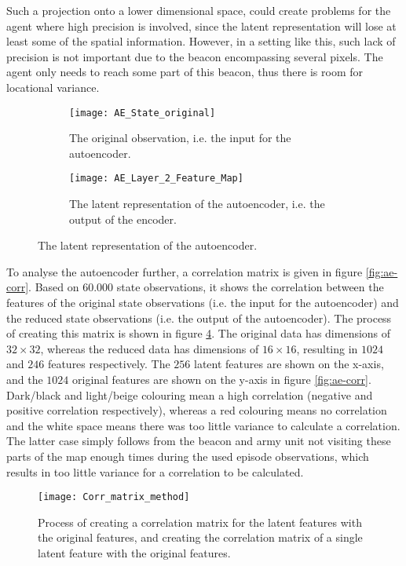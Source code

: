 Such a projection onto a lower dimensional space, could create problems for the agent where high precision is involved, since the latent representation will lose at least some of the spatial information. However, in a setting like this, such lack of precision is not important due to the beacon encompassing several pixels. The agent only needs to reach some part of this beacon, thus there is room for locational variance. 

\begin{figure}[h!]
	\centering
	\begin{subfigure}[b]{0.30\textwidth}
		\texttt{[image: AE\_State\_original]}
		\caption{The original observation, i.e. the input for the autoencoder.}
		\label{fig:ae-featuremap-original} 
	\end{subfigure}\hfill
	\begin{subfigure}[b]{0.30\textwidth}
		\texttt{[image: AE\_Layer\_2\_Feature\_Map]}
		\caption{The latent representation of the autoencoder, i.e. the output of the encoder.}
		\label{fig:ae-featuremap-layer2}
	\end{subfigure}
	\caption{The latent representation of the autoencoder.}
	\label{fig:ae-featuremap}
\end{figure}

To analyse the autoencoder further, a correlation matrix is given in figure \ref{fig:ae-corr}. Based on $60.000$ state observations, it shows the correlation between the features of the original state observations (i.e. the input for the autoencoder) and the reduced state observations (i.e. the output of the autoencoder). The process of creating this matrix is shown in figure \ref{fig:ae-corr-process}. The original data has dimensions of $32 \times 32$, whereas the reduced data has dimensions of $16 \times 16$, resulting in $1024$ and $246$ features respectively. The $256$ latent features are shown on the x-axis, and the $1024$ original features are shown on the y-axis in figure \ref{fig:ae-corr}. Dark/black and light/beige colouring mean a high correlation (negative and positive correlation respectively), whereas a red colouring means no correlation and the white space means there was too little variance to calculate a correlation. The latter case simply follows from the beacon and army unit not visiting these parts of the map enough times during the used episode observations, which results in too little variance for a correlation to be calculated.

\begin{figure}[h]
	\centering
	\texttt{[image: Corr\_matrix\_method]}
	\caption{Process of creating a correlation matrix for the latent features with the original features, and creating the correlation matrix of a single latent feature with the original features.}
	\label{fig:ae-corr-process}
\end{figure}

